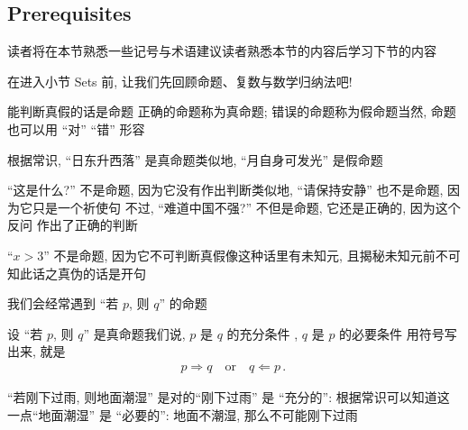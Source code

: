 \subsection*{Prerequisites}

读者将在本节熟悉一些记号与术语\period 建议读者熟悉本节的内容后学习下节的内容\period

在进入小节 Sets 前, 让我们先回顾命题、复数与数学归纳法吧!

\begin{definition}
    能判断真假的话是命题 \period 正确的命题称为真命题; 错误的命题称为假命题\period 当然, 命题也可以用 ``对'' ``错'' 形容\period
\end{definition}

\begin{example}
    根据常识, ``日东升西落'' 是真命题\period 类似地, ``月自身可发光'' 是假命题\period

    ``这是什么?'' 不是命题, 因为它没有作出判断\period 类似地, ``请保持安静'' 也不是命题, 因为它只是一个祈使句 \period 不过, ``难道中国不强?'' 不但是命题, 它还是正确的, 因为这个反问  作出了正确的判断\period

    ``$x > 3$'' 不是命题, 因为它不可判断真假\period 像这种话里有未知元, 且揭秘未知元前不可知此话之真伪的话是开句 \period
\end{example}

我们会经常遇到 ``若 $p$, 则 $q$'' 的命题\period

\begin{definition}
    设 ``若 $p$, 则 $q$'' 是真命题\period 我们说, $p$ 是 $q$ 的充分条件 , $q$ 是 $p$ 的必要条件 \period 用符号写出来, 就是
    \begin{align*}
        p \Rightarrow q \quad \text{or} \quad q \Leftarrow p \period
    \end{align*}
\end{definition}

\begin{example}
    ``若刚下过雨, 则地面潮湿'' 是对的\period ``刚下过雨'' 是 ``充分的'': 根据常识可以知道这一点\period ``地面潮湿'' 是 ``必要的'': 地面不潮湿, 那么不可能刚下过雨\period
\end{example}

